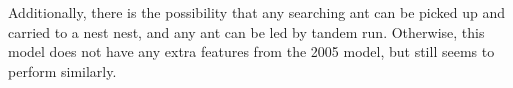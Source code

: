 \documentclass{article}
\makeatletter
\def\mcolor#1#{\@mcolor{#1}}
\def\@mcolor#1#2#3{%
  \protect\leavevmode
  \begingroup
    \color#1{#2}#3%
  \endgroup
}
\newcommand{\sitem}[1]
{
    \begin{itemize}
        \item #1
    \end{itemize}
}
\makeatother
\begin{document}
Additionally, there is the possibility that any searching ant can be picked up and carried to a nest nest, and any ant can be led by tandem run.
Otherwise, this model does not have any extra features from the 2005 model, but still seems to perform similarly.


\end{document}
